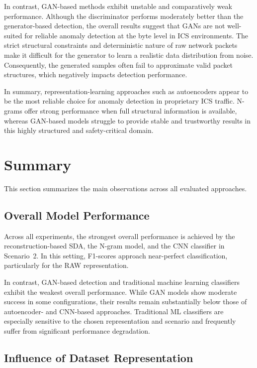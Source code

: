 In contrast, GAN-based methods exhibit unstable and comparatively weak performance. Although the discriminator performs moderately better than the generator-based detection, the overall results suggest that GANs are not well-suited for reliable anomaly detection at the byte level in ICS environments. The strict structural constraints and deterministic nature of raw network packets make it difficult for the generator to learn a realistic data distribution from noise. Consequently, the generated samples often fail to approximate valid packet structures, which negatively impacts detection performance.

In summary, representation-learning approaches such as autoencoders appear to be the most reliable choice for anomaly detection in proprietary ICS traffic. N-grams offer strong performance when full structural information is available, whereas GAN-based models struggle to provide stable and trustworthy results in this highly structured and safety-critical domain.

\section{Summary}


This section summarizes the main observations across all evaluated
approaches.

\subsection{Overall Model Performance}

Across all experiments, the strongest overall performance is achieved
by the reconstruction-based \ac{SDA}, the N-gram model,
and the \ac{CNN} classifier in Scenario~2.
In this setting, F1-scores approach near-perfect classification,
particularly for the RAW representation.

In contrast, GAN-based detection and traditional machine learning
classifiers exhibit the weakest overall performance.
While GAN models show moderate success in some configurations,
their results remain substantially below those of autoencoder- and
CNN-based approaches.
Traditional \ac{ML} classifiers are especially sensitive to the chosen
representation and scenario and frequently suffer from significant
performance degradation.

\subsection{Influence of Dataset Representation}

